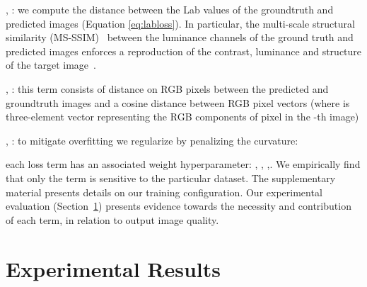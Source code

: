 \documentclass[a4paper,conference]{IEEEtran}
\begin{document}
{}, : we compute the  distance between the Lab values of the groundtruth and predicted images (Equation \ref{eq:labloss}). In particular, the multi-scale structural similarity (MS-SSIM)~\cite{wang03} between the luminance channels of the ground truth and predicted images enforces a reproduction of the contrast, luminance and structure of the target image~\cite{schwartz19}. 




{}

{}, : this term consists of  distance on RGB pixels between the predicted and groundtruth images and a cosine distance between RGB pixel vectors (where  is three-element vector representing the RGB components of pixel  in the -th image)

 


{}, : to mitigate overfitting we regularize by penalizing the curvature:


 
{}

{} each loss term has an associated weight hyperparameter: , , ,. We empirically find that only the  term is sensitive to the particular dataset. The supplementary material presents details on our training configuration. Our experimental evaluation (Section~\ref{sec:experiments}) presents evidence towards the necessity and contribution of each term, in relation to output image quality. 

\section{Experimental Results}\label{sec:experiments}
\end{document}
